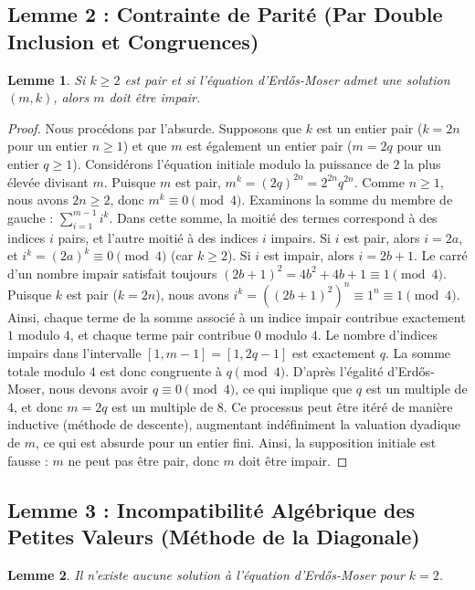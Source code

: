 \documentclass[11pt,a4paper]{article}
\newtheorem{lemma}{Lemme}
\begin{document}
\subsection{Lemme 2 : Contrainte de Parité (Par Double Inclusion et Congruences)}

\begin{lemma}
Si $k \geq 2$ est pair et si l'équation d'Erd\H{o}s-Moser admet une solution $(m,k)$, alors $m$ doit être impair.
\end{lemma}

\begin{proof}
Nous procédons par l'absurde. Supposons que $k$ est un entier pair ($k=2n$ pour un entier $n \geq 1$) et que $m$ est également un entier pair ($m=2q$ pour un entier $q \geq 1$).
Considérons l'équation initiale modulo la puissance de $2$ la plus élevée divisant $m$.
Puisque $m$ est pair, $m^k = (2q)^{2n} = 2^{2n} q^{2n}$. Comme $n \geq 1$, nous avons $2n \geq 2$, donc $m^k \equiv 0 \pmod 4$.
Examinons la somme du membre de gauche : $\sum_{i=1}^{m-1} i^k$.
Dans cette somme, la moitié des termes correspond à des indices $i$ pairs, et l'autre moitié à des indices $i$ impairs.
Si $i$ est pair, alors $i = 2a$, et $i^k = (2a)^k \equiv 0 \pmod 4$ (car $k \geq 2$).
Si $i$ est impair, alors $i = 2b+1$. Le carré d'un nombre impair satisfait toujours $(2b+1)^2 = 4b^2+4b+1 \equiv 1 \pmod 4$.
Puisque $k$ est pair ($k=2n$), nous avons $i^k = ((2b+1)^2)^n \equiv 1^n \equiv 1 \pmod 4$.
Ainsi, chaque terme de la somme associé à un indice impair contribue exactement $1$ modulo $4$, et chaque terme pair contribue $0$ modulo $4$.
Le nombre d'indices impairs dans l'intervalle $[1, m-1] = [1, 2q-1]$ est exactement $q$.
La somme totale modulo $4$ est donc congruente à $q \pmod 4$.
D'après l'égalité d'Erd\H{o}s-Moser, nous devons avoir $q \equiv 0 \pmod 4$, ce qui implique que $q$ est un multiple de $4$, et donc $m = 2q$ est un multiple de $8$.
Ce processus peut être itéré de manière inductive (méthode de descente), augmentant indéfiniment la valuation dyadique de $m$, ce qui est absurde pour un entier fini. Ainsi, la supposition initiale est fausse : $m$ ne peut pas être pair, donc $m$ doit être impair.
\end{proof}

\subsection{Lemme 3 : Incompatibilité Algébrique des Petites Valeurs (Méthode de la Diagonale)}

\begin{lemma}
Il n'existe aucune solution à l'équation d'Erd\H{o}s-Moser pour $k=2$.
\end{lemma}
\end{document}
